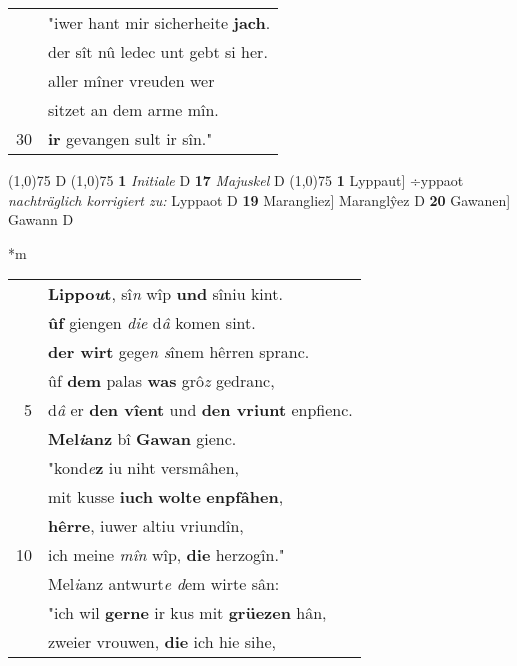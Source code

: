 \documentclass[8pt,a4paper,notitlepage]{article}
\begin{document}
\begin{table}[ht]
\begin{minipage}[t]{0.5\linewidth}
\begin{tabular}{rl}
 & "iwer hant mir sicherheite \textbf{jach}.\\ 
 & der sît nû ledec unt gebt si her.\\ 
 & aller mîner vreuden wer\\ 
 & sitzet an dem arme mîn.\\ 
30 & \textbf{ir} gevangen sult ir sîn."\\ 
\end{tabular}
\scriptsize
\line(1,0){75} \newline
D \newline
\line(1,0){75} \newline
\textbf{1} \textit{Initiale} D  \textbf{17} \textit{Majuskel} D  \newline
\line(1,0){75} \newline
\textbf{1} Lyppaut] ÷yppaot \textit{nachträglich korrigiert zu:} Lyppaot D \textbf{19} Marangliez] Maranglŷez D \textbf{20} Gawanen] Gawann D \newline
\end{minipage}
\hspace{0.5cm}
\begin{minipage}[t]{0.5\linewidth}
\small
\begin{center}*m
\end{center}
\begin{tabular}{rl}
 & \textbf{Lippo\textit{u}t}, sî\textit{n} wîp \textbf{und} sîniu kint.\\ 
 & \textbf{ûf} giengen \textit{die} d\textit{â} komen sint.\\ 
 & \textbf{der wirt} gege\textit{n s}înem hêrren spranc.\\ 
 & ûf \textbf{dem} palas \textbf{was} grô\textit{z} gedranc,\\ 
5 & d\textit{â} er \textbf{den vîent} und \textbf{den vriunt} enpfienc.\\ 
 & \textbf{Mel\textit{i}anz} bî \textbf{Gawan} gienc.\\ 
 & "kond\textit{e}\textbf{z} iu niht versmâhen,\\ 
 & mit kusse \textbf{iuch} \textbf{wolte} \textbf{enpfâhen},\\ 
 & \textbf{hêrre}, iuwer altiu vriundîn,\\ 
10 & ich meine \textit{mîn} wîp, \textbf{die} herzogîn."\\ 
 & Mel\textit{i}anz antwurt\textit{e d}em wirte sân:\\ 
 & "ich wil \textbf{gerne} ir kus mit \textbf{grüezen} hân,\\ 
 & zweier vrouwen, \textbf{die} ich hie sihe,\\ 

\end{tabular}
\end{minipage}
\end{table}
\end{document}
